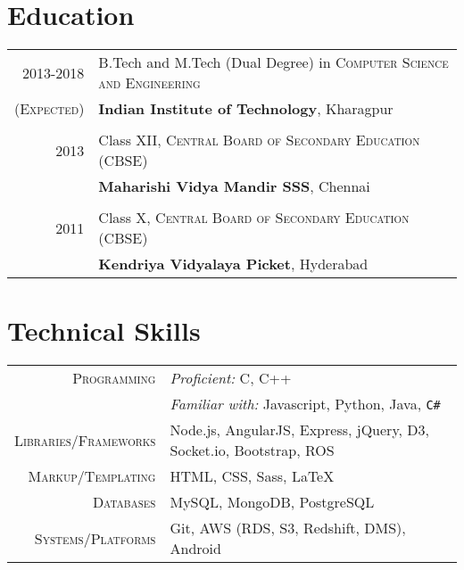 \documentclass[a4paper,10pt]{extarticle} %
\begin{document}

\section{Education}

\begin{tabular}{r|p{16cm}}	
2013-2018 & B.Tech and M.Tech (Dual Degree) in \textsc{Computer Science and Engineering}\\
\textsc{(Expected)}&\textbf{Indian Institute of Technology}, Kharagpur\\
&\\


2013& Class XII, \textsc{}\textsc{Central Board of Secondary Education (CBSE)} \\
&\normalsize\textbf{Maharishi Vidya Mandir SSS}, Chennai\\
&\\


2011 & Class X, \textsc{}\textsc{Central Board of Secondary Education (CBSE)} \\
&\normalsize\textbf{Kendriya Vidyalaya Picket}, Hyderabad\\

\end{tabular}


\section{Technical Skills}

\begin{tabular}{r|p{16cm}}
\textsc{Programming} & {\itshape{Proficient:}} C, C++\\
& {\itshape{Familiar with:}} Javascript, Python, Java, \verb!C#! \\
\textsc{Libraries/Frameworks} & Node.js, AngularJS, Express, jQuery, D3, Socket.io, Bootstrap, ROS\\
\textsc{Markup/Templating} & HTML, CSS, Sass, \LaTeX\\
\textsc{Databases} & MySQL, MongoDB, PostgreSQL\\
\textsc{Systems/Platforms} & Git, AWS (RDS, S3, Redshift, DMS), Android\\
\end{tabular}
\end{document}
